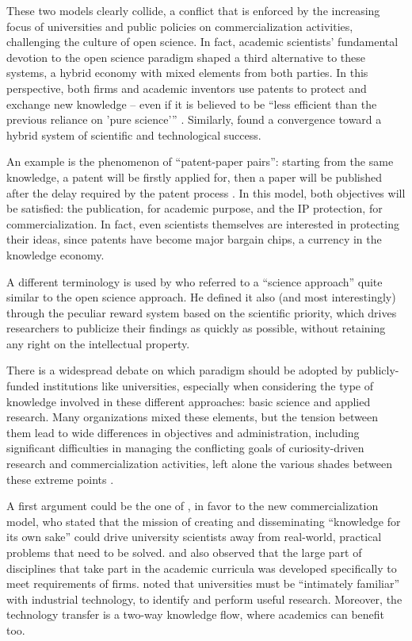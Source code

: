 These two models clearly collide, a conflict that is enforced by the increasing focus of universities and public policies on commercialization activities, challenging the culture of open science. In fact, academic scientists' fundamental devotion to the open science paradigm shaped a third alternative to these systems, a hybrid economy with mixed elements from both parties. In this perspective, both firms and academic inventors use patents to protect and exchange new knowledge – even if it is believed to be \enquote{less efficient than the previous reliance on 'pure science'} \citep{Geuna2009}. Similarly, \citet{OwenSmith2001} found a convergence toward a hybrid system of scientific and technological success.

An example is the phenomenon of \enquote{patent-paper pairs}: starting from the same knowledge, a patent will be firstly applied for, then a paper will be published after the delay required by the patent process \citep{Murray2005}. In this model, both objectives will be satisfied: the publication, for academic purpose, and the IP protection, for commercialization. In fact, even scientists themselves are interested in protecting their ideas, since patents have become major bargain chips, a currency in the knowledge economy.

A different terminology is used by \citet{Stern2004} who referred to a \enquote{science approach} quite similar to the open science approach. He defined it also (and most interestingly) through the peculiar reward system based on the scientific priority, which drives researchers to publicize their findings as quickly as possible, without retaining any right on the intellectual property. 

There is a widespread debate on which paradigm should be adopted by publicly-funded institutions like universities, especially when considering the type of knowledge involved in these different approaches: basic science and applied research. Many organizations mixed these elements, but the tension between them lead to wide differences in objectives and administration, including significant difficulties in managing the conflicting goals of curiosity-driven research and commercialization activities, left alone the various shades between these extreme points \citep{Rasmussen2006}.

A first argument could be the one of \citet{Geuna2009}, in favor to the new commercialization model, who stated that the mission of creating and disseminating \enquote{knowledge for its own sake} could drive university scientists away from real-world, practical problems that need to be solved. \citet{Rosenberg1994} and \citet{Nelson1998} also observed that the large part of disciplines that take part in the academic curricula was developed specifically to meet requirements of firms. \citet{Balconi2006} noted that universities must be \enquote{intimately familiar} with industrial technology, to identify and perform useful research. Moreover, the technology transfer is a two-way knowledge flow, where academics can benefit too.

